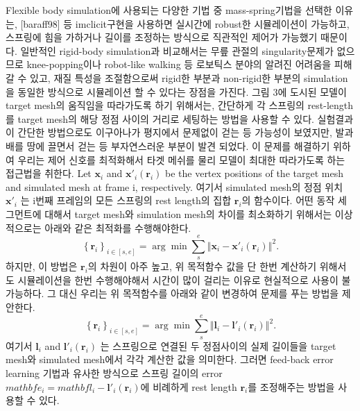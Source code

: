 \documentclass[11pt,a4paper]{article}
\begin{document}
                      
Flexible body simulation에 사용되는 다양한 기법 중 mass-spring기법을 선택한 이유는, [baraff98] 등 imclicit구현을 사용하면 실시간에 robust한 시뮬레이션이 가능하고, 스프링에 힘을 가하거나 길이를 조정하는 방식으로 직관적인 제어가 가능했기 때문이다. 일반적인 rigid-body simulation과 비교해서는 무릎 관절의 singularity문제가 없으므로 knee-popping이나 robot-like walking 등 로보틱스 분야의 알려진 어려움을 피해갈 수 있고, 재질 특성을 조절함으로써 rigid한 부분과 non-rigid한 부분의 simulation을 동일한 방식으로 시뮬레이션 할 수 있다는 장점을 가진다.
그림 3에 도시된 모델이 target mesh의 움직임을 따라가도록 하기 위해서는, 간단하게 각 스프링의 rest-length를 target mesh의 해당 정점 사이의 거리로 세팅하는 방법을 사용할 수 있다. 실험결과 이 간단한 방법으로도 이구아나가 평지에서 문제없이 걷는 등 가능성이 보였지만, 발과 배를 땅에 끌면서 걷는 등 부자연스러운 부분이 발견 되었다. 이 문제를 해결하기 위하여 우리는 제어 신호를 최적화해서 타겟 메쉬를 물리 모델이 최대한 따라가도록 하는 접근법을 취한다.
Let $\mathbf x_i$ and $\mathbf x'_i(\mathbf r_i)$ be the vertex positions of the target mesh and simulated mesh at frame i, respectively. 
여기서 simulated mesh의 정점 위치 $\mathbf x'_i$ 는 i번째 프레임의 모든 스프링의 rest length의 집합 $\mathbf r_i$의 함수이다. 
어떤 동작 세그먼트에 대해서 target mesh와 simulation mesh의 차이를 최소화하기 위해서는 이상적으로는 아래와 같은 최적화를 수행해야한다.
\begin{equation}
\left\{ \mathbf{r}_{i}\right\} _{i\in[s,e]}=\arg\min\sum_{s}^{e}\left\Vert\mathbf{x}_{i}-\mathbf{x}'_{i}\left(\mathbf{r}_{i}\right)\right\Vert^{2}.
\end{equation}
하지만, 이 방법은 $\mathbf{r}_{i}$의 차원이 아주 높고, 위 목적함수 값을 단 한번 계산하기 위해서도 시뮬레이션을 한번 수행해야해서 시간이 많이 걸리는 이유로 현실적으로 사용이 불가능하다. 그 대신 우리는 위 목적함수를 아래와 같이 변경하여 문제를 푸는 방법을 제안한다.
\begin{equation}
\left\{ \mathbf{r}_{i}\right\} _{i\in[s,e]}=\arg\min\sum_{s}^{e}\left\Vert\mathbf{l}_{i}-\mathbf{l}'_{i}\left(\mathbf{r}_{i}\right)\right\Vert^{2}.
\end{equation}
여기서 $\mathbf l_i$ and $\mathbf l'_i(\mathbf r_i)$ 는 스프링으로 연결된 두 정점사이의 실제 길이들을 target mesh와 simulated mesh에서 각각 계산한 값을 의미한다. 그러면 feed-back error learning 기법과 유사한 방식으로 스프링 길이의 error $mathbf e_i = mathbf{l}_{i}-\mathbf{l}'_{i}\left(\mathbf{r}_{i}\right)$에 비례하게 rest length $\mathbf{r}_{i}$를 조정해주는 방법을 사용할 수 있다. 
\end{document}
